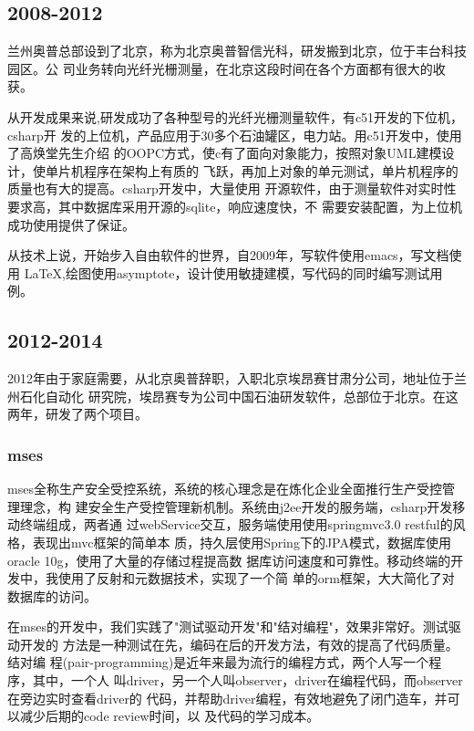 \subsection{2008-2012}

兰州奥普总部设到了北京，称为北京奥普智信光科，研发搬到北京，位于丰台科技园区。公
司业务转向光纤光栅测量，在北京这段时间在各个方面都有很大的收获。

从开发成果来说,研发成功了各种型号的光纤光栅测量软件，有c51开发的下位机，csharp开
发的上位机，产品应用于30多个石油罐区，电力站。用c51开发中，使用了高焕堂先生介绍
的OOPC方式，使c有了面向对象能力，按照对象UML建模设计，使单片机程序在架构上有质的
飞跃，再加上对象的单元测试，单片机程序的质量也有大的提高。csharp开发中，大量使用
开源软件，由于测量软件对实时性要求高，其中数据库采用开源的sqlite，响应速度快，不
需要安装配置，为上位机成功使用提供了保证。

从技术上说，开始步入自由软件的世界，自2009年，写软件使用emacs，写文档使用
\LaTeX{},绘图使用asymptote，设计使用敏捷建模，写代码的同时编写测试用例。

\subsection{2012-2014}

2012年由于家庭需要，从北京奥普辞职，入职北京埃昂赛甘肃分公司，地址位于兰州石化自动化
研究院，埃昂赛专为公司中国石油研发软件，总部位于北京。在这两年，研发了两个项目。

\subsubsection{mses}

mses全称生产安全受控系统，系统的核心理念是在炼化企业全面推行生产受控管理理念，构
建安全生产受控管理新机制。系统由j2ee开发的服务端，csharp开发移动终端组成，两者通
过webService交互，服务端使用使用springmvc3.0 restful的风格，表现出mvc框架的简单本
质，持久层使用Spring下的JPA模式，数据库使用oracle 10g，使用了大量的存储过程提高数
据库访问速度和可靠性。移动终端的开发中，我使用了反射和元数据技术，实现了一个简
单的orm框架，大大简化了对数据库的访问。

在mses的开发中，我们实践了"测试驱动开发"和"结对编程"，效果非常好。测试驱动开发的
方法是一种测试在先，编码在后的开发方法，有效的提高了代码质量。结对编
程(pair-programming)是近年来最为流行的编程方式，两个人写一个程序，其中，一个人
叫driver，另一个人叫observer，driver在编程代码，而observer在旁边实时查看driver的
代码，并帮助driver编程，有效地避免了闭门造车，并可以减少后期的code review时间，以
及代码的学习成本。

